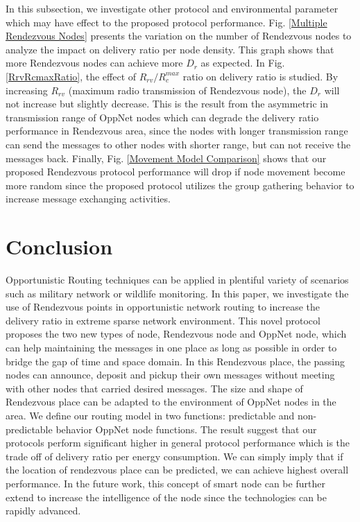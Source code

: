 In this subsection, we investigate other protocol and environmental parameter which may have effect to the proposed protocol performance.
%
Fig. \ref{Multiple Rendezvous Nodes} presents the variation on the number of Rendezvous nodes to analyze the impact on delivery ratio per node density.
%
This graph shows that more Rendezvous nodes can achieve more $D_r$ as expected.
%
In Fig. \ref{RrvRcmaxRatio}, the effect of $R_{rv}/R_c^{max}$ ratio on delivery ratio is studied.
% 
By increasing $R_{rv}$ (maximum radio transmission of Rendezvous node), the $D_r$ will not increase but slightly decrease.
%
This is the result from the asymmetric in transmission range of OppNet nodes which can degrade the delivery ratio performance in Rendezvous area, since the nodes with longer transmission range can send the messages to other nodes with shorter range, but can not receive the messages back.
Finally, Fig. \ref{Movement Model Comparison} shows that our proposed Rendezvous protocol performance will drop if node movement become more random since the proposed protocol utilizes the group gathering behavior to increase message exchanging activities.

\section{Conclusion}
\label{DRRA:Conclusion}

Opportunistic Routing techniques can be applied in  plentiful variety of scenarios such as military network or wildlife monitoring. 
%
In this paper, we investigate the use of Rendezvous points in opportunistic network routing to increase the delivery ratio in extreme sparse network environment.
%
This novel protocol proposes the two new types of node, Rendezvous node and OppNet node, which can help maintaining the messages in one place as long as possible in order to bridge the gap of time and space domain.
%
In this Rendezvous place, the passing nodes can announce, deposit and pickup their own messages without meeting with other nodes that carried desired messages.
%
The size and shape of  Rendezvous place can be adapted to the environment of OppNet nodes in the area.
%
We define our routing model in two functions: predictable  and non-predictable behavior OppNet node functions.
%
The result suggest that our protocols perform significant higher in general protocol performance which is the trade off of delivery ratio per energy consumption.
%
We can simply imply that if the location of rendezvous place can be predicted, we can achieve highest overall performance.
In the future work, this concept of smart node can be further extend to increase the intelligence of the node since the technologies can be rapidly advanced.



